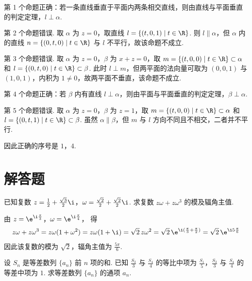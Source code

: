 \begin{solution}
第 1 个命题正确：若一条直线垂直于平面内两条相交直线，则由直线与平面垂直的判定定理，\(l\perp\alpha\).

第 2 个命题错误. 取 \(\alpha\) 为 \(z=0\)，取直线 \(l=\{(t,0,1)\mid t\in\R\}\). 则 \(l\parallel\alpha\)，但 \(\alpha\) 内的直线 \(n=\{(0,t,0)\mid t\in\R\}\) 与 \(l\) 不平行，故该命题不成立.

第 3 个命题错误. 取 \(\alpha\) 为 \(z=0\)，\(\beta\) 为 \(x+z=0\)，取 \(m=\{(t,0,0)\mid t\in\R\}\subset\alpha\) 和 \(l=\{(0,t,0)\mid t\in\R\}\subset\beta\). 此时 \(l\perp m\)，但两平面的法向量可取为 \((0,0,1)\) 与 \((1,0,1)\)，内积为 \(1\ne0\)，故两平面不垂直，该命题不成立.

第 4 个命题正确：若 \(\beta\) 内有直线 \(l\perp\alpha\)，则由平面与平面垂直的判定定理，\(\beta\perp\alpha\).

第 5 个命题错误. 取 \(\alpha\) 为 \(z=0\)，\(\beta\) 为 \(z=1\)，取 \(m=\{(t,0,0)\mid t\in\R\}\subset\alpha\) 和 \(l=\{(0,t,1)\mid t\in\R\}\subset\beta\). 虽然 \(\alpha\parallel\beta\)，但 \(m\) 与 \(l\) 方向不同且不相交，二者并不平行.

因此正确的序号是 \(1\)，\(4\).
\end{solution}

\section{解答题}

\begin{problem}
已知复数 \(z = \frac{1}{2} + \frac{\sqrt{3}}{2}\i\)，\(\omega = \frac{\sqrt{2}}{2} + \frac{\sqrt{2}}{2}\i\). 求复数 \(z\omega + z\omega^3\) 的模及辐角主值.
\end{problem}

\begin{solution}
由 \(z=\e^{\i\frac{\pi}{3}}\)，\(\omega=\e^{\i\frac{\pi}{4}}\)，
得
\[
z\omega+z\omega^3
=z\omega(1+\omega^2)
=z\omega(1+\i)
=\sqrt2\,z\omega^2
=\sqrt2\,\e^{\i(\frac{\pi}{3}+\frac{\pi}{2})}
=\sqrt2\,\e^{\i5\frac{\pi}{6}}
\]
因此该复数的模为 \(\sqrt2\)，辐角主值为 \(\frac{5\pi}{6}\).
\end{solution}

\begin{problem}
设 \(S_{n}\) 是等差数列 \(\{a_{n}\}\) 前 \(n\) 项的和. 已知 \(\frac{S_{3}}{3}\) 与 \(\frac{S_{4}}{4}\) 的等比中项为 \(\frac{S_{1}}{5}\)，\(\frac{S_{3}}{3}\) 与 \(\frac{S_{4}}{4}\) 的等差中项为 \(1\). 求等差数列 \(\{a_{n}\}\) 的通项 \(a_{n}\).
\end{problem}

